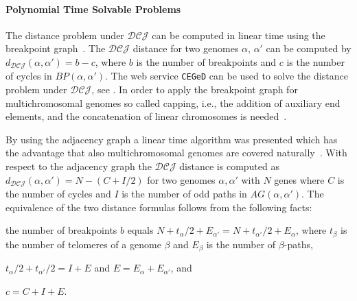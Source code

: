 \documentclass{svmult}
\newcommand{\m}[1]{\mathcal{#1}}
\begin{document}
\paragraph{Polynomial Time Solvable Problems}

The distance problem under $\m{DCJ}$ can be computed in linear time 
using the breakpoint graph~\cite{Yancopoulos_2005}.
The $\m{DCJ}$ distance for two genomes $\alpha$, $\alpha'$ can be computed by
$d_{\m{DCJ}}(\alpha,\alpha')=b-c$, 
where $b$ is the number of breakpoints and $c$ is the
number of cycles in $BP(\alpha,\alpha')$. 
The web service \texttt{CEGeD} can be used to solve the distance problem
under $\m{DCJ}$, see .
In order to apply the breakpoint graph
for multichromosomal genomes so called capping, i.e., 
the addition of auxiliary end elements, and the concatenation of linear chromosomes is needed~\cite{Yancopoulos_2005}.

By using the adjacency graph a linear time algorithm was presented which has
the advantage that also multichromosomal genomes are covered naturally~\cite{Bergeron_2006}.
With respect to the adjacency graph the $\m{DCJ}$ distance is computed as 
$d_{\m{DCJ}}(\alpha,\alpha')=N-(C+I/2)$ 
for two genomes $\alpha,\alpha'$ with $N$ genes where $C$ is the
number of cycles and $I$ is the number of odd paths in $AG(\alpha,\alpha')$.
%
The equivalence of the two distance formulas follows from the following facts: 
\begin{inparaenum}[i)]
	\item the number of breakpoints $b$ equals
	$N+t_{\alpha}/2+E_{\alpha'} =
	N+t_{\alpha'}/2+E_{\alpha}$, where
	$t_{\beta}$ is the number
	of telomeres of a genome $\beta$ and $E_{\beta}$ is the number of
	$\beta$-paths,
	\item $t_{\alpha}/2+t_{\alpha'}/2 = I+E$ and
	$E=E_{\alpha}+E_{\alpha'}$, and
	\item $c=C+I+E$.
\end{inparaenum}
\end{document}
